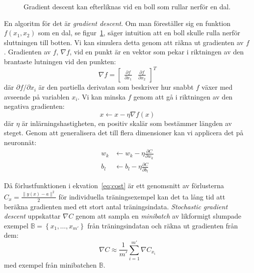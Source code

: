 \begin{figure}
	\centering
	\caption{Gradient descent kan efterliknas vid en boll som rullar nerför en dal.}
	\label{fig:descent}
\end{figure}

En algoritm för det är \emph{gradient descent}.
Om man föreställer sig en funktion $ f(x_1, x_2) $ som en dal,
se figur~\ref{fig:descent},
säger intuition att en boll skulle rulla nerför sluttningen till botten.
Vi kan simulera detta genom att räkna ut gradienten av $ f $.
Gradienten av $ f $, $ \nabla f $, vid en punkt är en vektor
som pekar i riktningen av den brantaste lutningen vid den punkten:
\begin{equation}
	\nabla f = \begin{bmatrix} \frac{\partial f}{\partial x_1} & \frac{\partial f}{\partial x_2} \end{bmatrix}^{T}
\end{equation}
där $ \partial f / \partial x_i $ är den partiella derivatan
som beskriver hur snabbt $ f $ växer med avseende på variablen $ x_i $.
Vi kan minska $ f $ genom att gå i riktningen av den negativa gradienten:
\begin{equation}
	x \leftarrow x - \eta \nabla f(x)
\end{equation}
där $ \eta $ är inlärningshastigheten,
en positiv skalär som bestämmer längden av steget.
Genom att generalisera det till flera dimensioner kan vi
applicera det på neuronnät:
\begin{align}
	w_k &\leftarrow w_k - \eta \frac{\partial C}{\partial w_k} \\
	b_l &\leftarrow b_l - \eta \frac{\partial C}{\partial b_l}
\end{align}

Då förlustfunktionen i ekvation~\eqref{eq:cost} är ett genomsnitt av
förlusterna $ C_x = \frac{\lVert y(x) - a \rVert^2}{2} $ för individuella träningsexempel
kan det ta lång tid att beräkna gradienten med ett stort antal träningsindata.
\emph{Stochastic gradient descent} uppskattar $ \nabla C $ genom att
sampla en \emph{minibatch} av likformigt slumpade exempel
$ \mathbb{B} = \left\{ x_1, \dotsc, x_{m'} \right\} $ från träningsindatan
och räkna ut gradienten från dem:
\begin{equation}
	\nabla C \approx \frac{1}{m'} \sum^{m'}_{i=1} \nabla C_{x_i}
\end{equation}
med exempel från minibatchen $ \mathbb{B} $.
\autocite{nielsen15}


